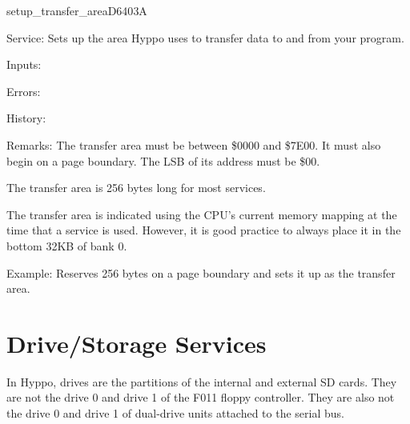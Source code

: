 %
\newpage
\begin{hyppotrap}{setup\_transfer\_area}{D640}{3A}
\item [Service:]
  Sets up the area Hyppo uses to transfer data to and from your program.
\item [Inputs:]
\item [Errors:]
\item [History:]
\item [Remarks:]
  The transfer area must be between \$0000 and \$7E00. It must also begin on a
  page boundary. The LSB of its address must be \$00.

  The transfer area is 256 bytes long for most services.

  The transfer area is indicated using the CPU's current memory mapping at
  the time that a service is used. However, it is good practice to always
  place it in the bottom 32KB of bank 0.
\item [Example:]
  Reserves 256 bytes on a page boundary and sets it up as the transfer area.
\end{hyppotrap}



\newpage
\section{Drive/Storage Services}


In Hyppo, drives are the partitions of the internal and external SD cards.
They are not the drive 0 and drive 1 of the F011 floppy controller. They
are also not the drive 0 and drive 1 of dual-drive units attached to the serial
bus.


